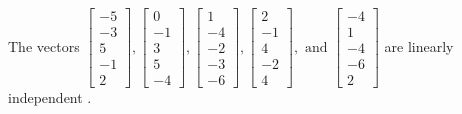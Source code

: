 \begin{exercise}
\begin{exerciseStatement}
  \end{exerciseStatement}
  \begin{exerciseAnswer}
   The vectors \(\left[\begin{array}{r}
-5 \\
-3 \\
5 \\
-1 \\
2
\end{array}\right] , \left[\begin{array}{r}
0 \\
-1 \\
3 \\
5 \\
-4
\end{array}\right] , \left[\begin{array}{r}
1 \\
-4 \\
-2 \\
-3 \\
-6
\end{array}\right] , \left[\begin{array}{r}
2 \\
-1 \\
4 \\
-2 \\
4
\end{array}\right] , \text{ and } \left[\begin{array}{r}
-4 \\
1 \\
-4 \\
-6 \\
2
\end{array}\right]\) are 
  	 linearly independent  .
  


  \end{exerciseAnswer}
\end{exercise}